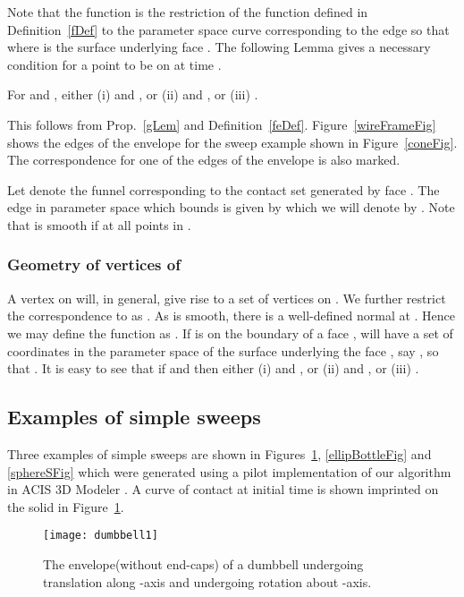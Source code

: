 \documentclass{elsart5p}
\begin{document}
Note that the function  is the restriction of the function  defined in Definition~\ref{fDef} to 
the parameter space curve  corresponding to the edge  so that  
where  is the surface underlying face .  The following Lemma gives a necessary condition for 
a point  to be on  at time .
\begin{lem} \label{feLem}
For  and , either (i)  and , or 
(ii)  and , or (iii) .
\end{lem}
  This follows from Prop.~\ref{gLem} and Definition~\ref{feDef}. 
\hfill 
Figure~\ref{wireFrameFig} shows the edges of the envelope for 
the sweep example shown in Figure~\ref{coneFig}.  The correspondence for one of the edges of the envelope is also marked.


Let  denote the funnel corresponding to the contact set generated by face .
The edge in parameter space which bounds  is given by 
 which we will denote by 
.  Note that  is smooth if 
 at all points
in .


\subsubsection{Geometry of vertices of }

A vertex  on  will, in general, give rise to a set of vertices on .  We further 
restrict the correspondence  to  as .  As  is smooth, there is a well-defined normal at .  Hence we may define the function 
 as .  If  is on the boundary of a face ,  will 
have a set of coordinates in the parameter space of the surface  underlying the face , say , 
so that .  It is easy to see that if  and  then 
either (i)  and , or (ii)  and , or (iii) .

\subsection{Examples of simple sweeps}

Three examples of simple sweeps are shown in Figures~\ref{dumbbellFig}, \ref{ellipBottleFig} 
and \ref{sphereSFig} which 
were generated using a pilot implementation of our algorithm in ACIS 3D Modeler \cite{acis}.
A curve of contact at initial time is shown imprinted on the solid in Figure~\ref{dumbbellFig}.

\begin{figure}
 \centering
 \texttt{[image: dumbbell1]}
 \caption{The envelope(without end-caps) of a dumbbell undergoing translation along -axis and undergoing rotation about -axis.}
 \label{dumbbellFig}
\end{figure}
\end{document}
